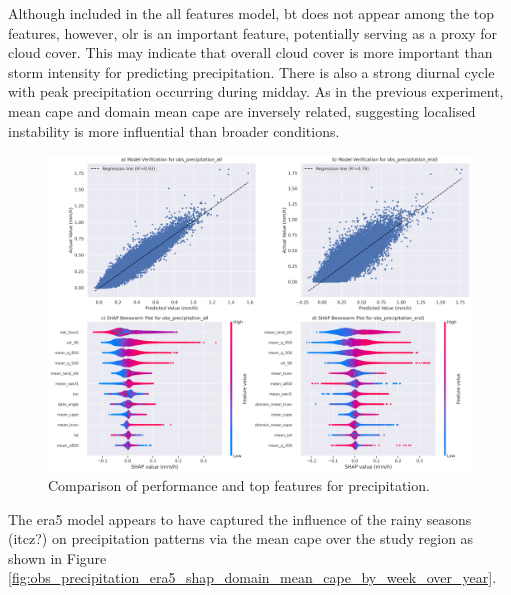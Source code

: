 Although included in the all features model, \acrfull{bt} does not appear among the top features, however, \acrfull{olr} is an important feature, potentially serving as a proxy for cloud cover. This may indicate that overall cloud cover is more important than storm intensity for predicting precipitation. There is also a strong diurnal cycle with peak precipitation occurring during midday. As in the previous experiment, mean \acrshort{cape} and domain mean \acrshort{cape} are inversely related, suggesting localised instability is more influential than broader conditions.

\begin{figure}[ht]
    \centering
    \includegraphics[width=\textwidth]{../figures/generated/experiments/obs_precipitation/obs_precipitation_summary.png}
    \caption{Comparison of performance and top features for precipitation.}
    \label{fig:obs_precipitation_summary}
\end{figure}

The \acrshort{era5} model appears to have captured the influence of the rainy seasons (\acrshort{itcz}?) on precipitation patterns via the mean \acrshort{cape} over the study region as shown in Figure \ref{fig:obs_precipitation_era5_shap_domain_mean_cape_by_week_over_year}.

